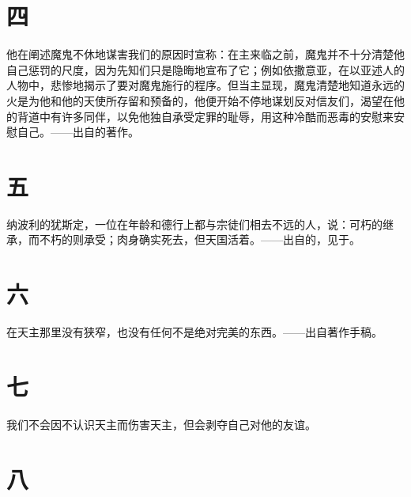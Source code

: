 
\section{四}

他在阐述魔鬼不休地谋害我们的原因时宣称：在主来临之前，魔鬼并不十分清楚他自己惩罚的尺度，因为先知们只是隐晦地宣布了它；例如依撒意亚，在以亚述人的人物中，悲惨地揭示了要对魔鬼施行的程序。但当主显现，魔鬼清楚地知道永远的火是为他和他的天使所存留和预备的，他便开始不停地谋划反对信友们，渴望在他的背道中有许多同伴，以免他独自承受定罪的耻辱，用这种冷酷而恶毒的安慰来安慰自己。——出自的著作。\par


\section{五}

纳波利的犹斯定，一位在年龄和德行上都与宗徒们相去不远的人，说：可朽的继承，而不朽的则承受；肉身确实死去，但天国活着。——出自的，见于。\par


\section{六}

在天主那里没有狭窄，也没有任何不是绝对完美的东西。——出自著作手稿。\par


\section{七}

我们不会因不认识天主而伤害天主，但会剥夺自己对他的友谊。\par


\section{八}

